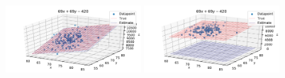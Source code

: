 \documentclass[12pt]{article}
\begin{document}
\begin{figure}[H]
            \includegraphics[width=0.45\textwidth]{f_4_noise0_estplot_ard}
            \includegraphics[width=0.45\textwidth]{f_4_noise0_estplot_regular}
        \end{figure}
\end{document}
